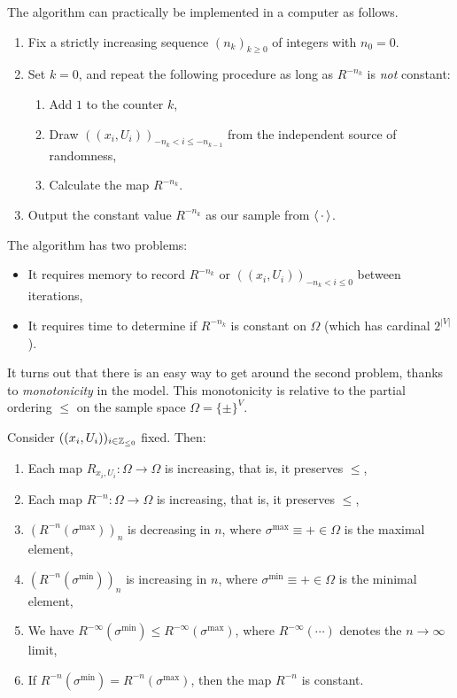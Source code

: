 The algorithm can practically be implemented in a computer as follows.
\begin{enumerate}
    \item Fix a strictly increasing sequence $(n_k)_{k\geq 0}$ of integers with $n_0=0$.
    \item Set $k=0$, and repeat the following procedure as long as $R^{-n_k}$ is \emph{not} constant:
    \begin{enumerate}
        \item Add $1$ to the counter $k$,
        \item Draw $((x_i,U_i))_{-n_k< i\leq -n_{k-1}}$ from the independent source of randomness,
        \item Calculate the map $R^{-n_k}$.
    \end{enumerate}
    \item Output the constant value $R^{-n_k}$ as our sample from $\langle\,\cdot\,\rangle$.
\end{enumerate}

The algorithm has two problems:
\begin{itemize}
    \item It requires memory to record $R^{-n_k}$ or $((x_i,U_i))_{-n_k< i\leq 0}$ between iterations,
    \item It requires time to determine if $R^{-n_k}$ is constant on $\Omega$ (which has cardinal $2^{|V|}$).
\end{itemize}

It turns out that there is an easy way to get around the second problem,
thanks to \emph{monotonicity} in the model.
This monotonicity is relative to the partial ordering $\leq$
on the sample space $\Omega=\{\pm\}^V$.

\begin{lemma}
    Consider $((x_i,U_i))_{i\in\mathbb Z_{\leq 0}}$ fixed. Then:
    \begin{enumerate}
        \item Each map $R_{x_i,U_i}:\Omega\to\Omega$ is increasing, that is, it preserves $\leq$,
        \item Each map $R^{-n}:\Omega\to\Omega$ is increasing, that is, it preserves $\leq$,
        \item $(R^{-n}(\sigma^{\max}))_n$ is decreasing in $n$, where $\sigma^{\max}\equiv+\in\Omega$ is the maximal element,
        \item $(R^{-n}(\sigma^{\min}))_n$ is increasing in $n$, where $\sigma^{\min}\equiv+\in\Omega$ is the minimal element,
        \item We have $R^{-\infty}(\sigma^{\min})\leq R^{-\infty}(\sigma^{\max})$,
        where $R^{-\infty}(\cdots)$ denotes the $n\to\infty$ limit,
        \item If  $R^{-n}(\sigma^{\min})= R^{-n}(\sigma^{\max})$, then the map $R^{-n}$ is constant.
    \end{enumerate}
\end{lemma}

